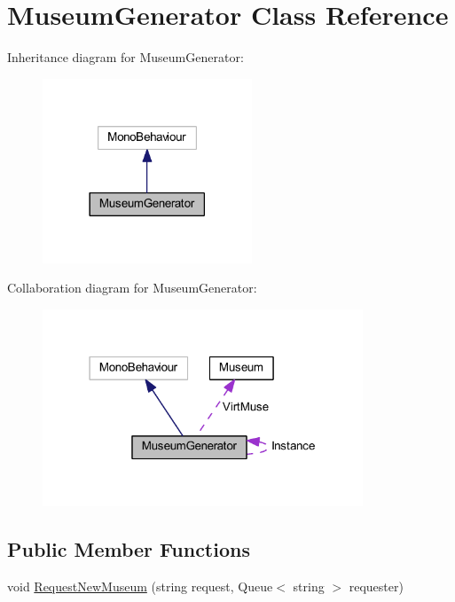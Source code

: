 \hypertarget{class_museum_generator}{}\section{Museum\+Generator Class Reference}
\label{class_museum_generator}


Inheritance diagram for Museum\+Generator\+:
\nopagebreak
\begin{figure}[H]
\begin{center}
\leavevmode
\includegraphics[width=177pt]{class_museum_generator__inherit__graph}
\end{center}
\end{figure}


Collaboration diagram for Museum\+Generator\+:
\nopagebreak
\begin{figure}[H]
\begin{center}
\leavevmode
\includegraphics[width=271pt]{class_museum_generator__coll__graph}
\end{center}
\end{figure}
\subsection*{Public Member Functions}
\begin{DoxyCompactItemize}
\item 
void \mbox{\hyperlink{class_museum_generator_a5ead852effaa81309fe98b4d61fe9759}{Request\+New\+Museum}} (string request, Queue$<$ string $>$ requester)
\end{DoxyCompactItemize}
